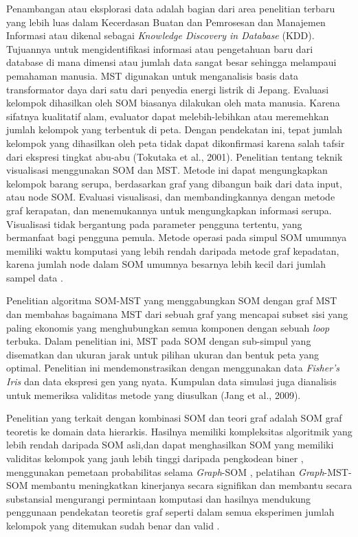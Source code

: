 Penambangan atau eksplorasi data adalah bagian dari area penelitian terbaru  yang lebih luas dalam Kecerdasan Buatan dan Pemrosesan dan Manajemen Informasi atau dikenal sebagai \textit{Knowledge Discovery in Database} (KDD). Tujuannya untuk mengidentifikasi informasi atau pengetahuan baru dari database di mana dimensi atau jumlah data sangat besar sehingga melampaui pemahaman manusia. MST digunakan untuk menganalisis basis data transformator daya dari satu dari penyedia energi listrik di Jepang. Evaluasi kelompok dihasilkan oleh SOM biasanya dilakukan oleh mata manusia. Karena sifatnya kualitatif alam, evaluator dapat melebih-lebihkan atau meremehkan jumlah kelompok yang terbentuk di peta. Dengan pendekatan ini, tepat jumlah kelompok yang dihasilkan oleh peta tidak dapat dikonfirmasi karena salah tafsir dari ekspresi tingkat abu-abu (Tokutaka et al., 2001).
Penelitian tentang teknik visualisasi menggunakan SOM dan MST. Metode ini dapat mengungkapkan kelompok barang serupa, berdasarkan graf yang dibangun baik dari data input, atau node SOM. Evaluasi visualisasi, dan membandingkannya dengan metode graf kerapatan, dan menemukannya untuk mengungkapkan informasi serupa. Visualisasi tidak bergantung pada parameter pengguna tertentu, yang bermanfaat bagi pengguna pemula. Metode operasi pada simpul SOM umumnya memiliki waktu komputasi yang lebih rendah daripada metode graf kepadatan, karena jumlah node dalam SOM umumnya besarnya lebih kecil dari jumlah sampel data \citep{MayerRauber2010}.

Penelitian algoritma SOM-MST yang menggabungkan SOM dengan graf MST dan membahas bagaimana MST dari sebuah graf yang mencapai subset sisi yang paling ekonomis yang menghubungkan semua komponen dengan sebuah \textit{loop} terbuka. Dalam penelitian ini, MST pada SOM dengan sub-simpul yang disematkan dan ukuran jarak untuk pilihan ukuran dan bentuk peta yang optimal. Penelitian ini mendemonstrasikan dengan menggunakan data \textit{Fisher's Iris} dan data ekspresi gen yang nyata. Kumpulan data simulasi juga dianalisis untuk memeriksa validitas metode yang diusulkan (Jang et al., 2009).

Penelitian yang terkait dengan kombinasi SOM dan teori graf adalah SOM graf teoretis ke domain data hierarkis. Hasilnya memiliki kompleksitas algoritmik yang lebih rendah daripada SOM asli,dan dapat menghasilkan SOM yang memiliki validitas kelompok yang jauh lebih tinggi daripada pengkodean biner \citep{Argyrou2009}, menggunakan pemetaan probabilitas selama \textit{Graph}-SOM \citep{Hagenbuchner2009}, pelatihan \textit{Graph}-MST-SOM membantu meningkatkan kinerjanya secara signifikan dan membantu secara substansial mengurangi permintaan komputasi \citep{MayerRauber2010,Resta2016} dan hasilnya mendukung penggunaan pendekatan teoretis graf seperti dalam semua eksperimen jumlah kelompok yang ditemukan sudah benar dan valid \citep{Silva2011}.

